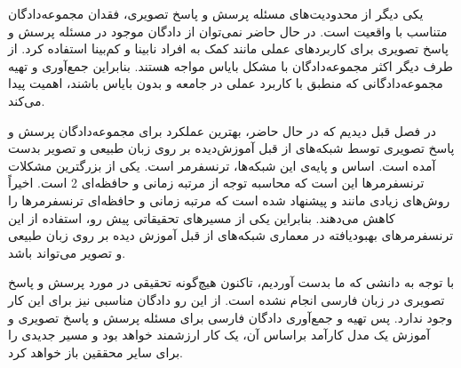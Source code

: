 یکی دیگر از محدودیت‌های مسئله پرسش و پاسخ تصویری، فقدان مجموعه‌دادگان متناسب با واقعیت است. در حال حاضر نمی‌توان از دادگان موجود در مسئله پرسش و پاسخ تصویری برای کاربرد‌های عملی مانند کمک به افراد نابینا و کم‌بینا استفاده کرد. از طرف دیگر اکثر مجموعه‌دادگان با مشکل بایاس مواجه هستند. بنابراین جمع‌آوری و تهیه مجموعه‌دادگانی که منطبق با کاربرد عملی در جامعه و بدون بایاس باشند، اهمیت پیدا می‌کند.

در فصل قبل دیدیم که در حال حاضر، بهترین عملکرد برای مجموعه‌دادگان پرسش و پاسخ تصویری توسط شبکه‌های از قبل آموزش‌دیده بر روی زبان طبیعی و تصویر بدست آمده است. اساس و پایه‌ی این شبکه‌ها، ترنسفرمر است. یکی از بزرگترین مشکلات ترنسفرمرها این است که محاسبه توجه از مرتبه زمانی و حافظه‌ای 2 است. اخیراً روش‌های زیادی مانند
\cite{kitaev2020reformer}
و
\cite{performer}
پیشنهاد شده است که مرتبه زمانی و حافظه‌ای ترنسفرمرها را کاهش می‌دهند. بنابراین یکی از مسیرهای تحقیقاتی پیش رو، استفاده از این ترنسفرمر‌های بهبودیافته در معماری شبکه‌های از قبل آموزش دیده بر روی زبان طبیعی و تصویر می‌تواند باشد.

با توجه به دانشی که ما بدست آوردیم، تاکنون هیچ‌گونه تحقیقی در مورد پرسش و پاسخ تصویری
در زبان فارسی انجام نشده است. از این رو دادگان مناسبی نیز برای این کار وجود ندارد. پس تهیه و جمع‌آوری دادگان فارسی برای مسئله پرسش و پاسخ تصویری و آموزش یک مدل کارآمد براساس آن، یک کار ارزشمند خواهد بود و مسیر جدیدی را برای سایر محققین باز خواهد کرد.



